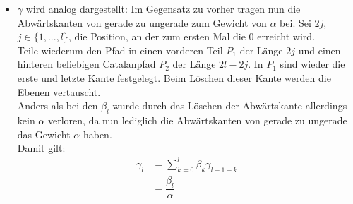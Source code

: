 \documentclass[a4paper, 11pt]{scrreprt}
\begin{document}
\begin{itemize}
\item $ \gamma $ wird analog dargestellt: Im Gegensatz zu vorher tragen nun die Abwärtskanten von gerade zu ungerade zum Gewicht von $ \alpha $ bei. Sei \(2j\), \(j\in\{1,...,l\}\), die Position, an der zum ersten Mal die \(0\) erreicht wird. \\
Teile wiederum den Pfad in einen vorderen Teil \(P_1\) der Länge \(2j\) und einen hinteren beliebigen Catalanpfad \(P_2\) der Länge \(2l-2j\). In \(P_1\) sind wieder die erste und letzte Kante festgelegt. Beim Löschen dieser Kante werden die Ebenen vertauscht. \\
Anders als bei den $ \beta_l $ wurde durch das Löschen der Abwärtskante allerdings kein $ \alpha $ verloren, da nun lediglich die Abwärtskanten von gerade zu ungerade das Gewicht $ \alpha $ haben.\\ 
Damit gilt: 
\begin{equation}
	\begin{split}
		\gamma_l &=\sum_{k=0}^l \beta_k\gamma_{l-1-k} \\
		&= \dfrac{\beta_l}{\alpha}
	\end{split}
\end{equation}


\end{itemize}
\end{document}
